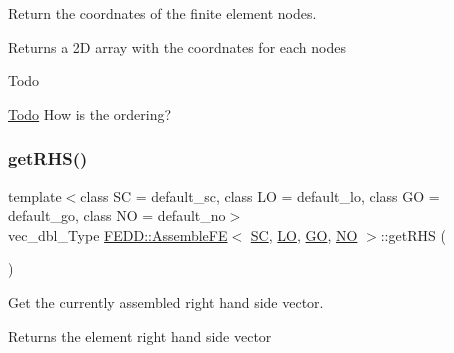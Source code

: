 Return the coordnates of the finite element nodes. 

\begin{DoxyReturn}{Returns}
a 2D array with the coordnates for each nodes 
\end{DoxyReturn}
\begin{DoxyRefDesc}{Todo}
\item[\hyperlink{todo__todo000004}{Todo}]How is the ordering? \end{DoxyRefDesc}
\mbox{\label{classFEDD_1_1AssembleFE_a15f6f643268ff4571437bbb98b7325c5}} 
\subsubsection{\texorpdfstring{get\+R\+H\+S()}{getRHS()}}
{\footnotesize\ttfamily template$<$class SC  = default\+\_\+sc, class LO  = default\+\_\+lo, class GO  = default\+\_\+go, class NO  = default\+\_\+no$>$ \\
vec\+\_\+dbl\+\_\+\+Type \hyperlink{classFEDD_1_1AssembleFE}{F\+E\+D\+D\+::\+Assemble\+FE}$<$ \hyperlink{fe__test__laplace_8cpp_a79c7e86a57edbb2a5a53242bcd04e41e}{SC}, \hyperlink{fe__test__laplace_8cpp_ad6a38c9f07d3fd633eefca5bccad8410}{LO}, \hyperlink{fe__test__laplace_8cpp_afa2946b509009b4f45eb04bd8c5b27d9}{GO}, \hyperlink{fe__test__laplace_8cpp_a5e24f37b28787429872b6ecb1d0417ce}{NO} $>$\+::get\+R\+HS (\begin{DoxyParamCaption}{ }\end{DoxyParamCaption})\hspace{0.3cm}{\ttfamily [inline]}}



Get the currently assembled right hand side vector. 

\begin{DoxyReturn}{Returns}
the element right hand side vector 
\end{DoxyReturn}
\mbox{\label{classFEDD_1_1AssembleFE_a33e83a1eb6656a74609dfbfaf3fae474}} 
